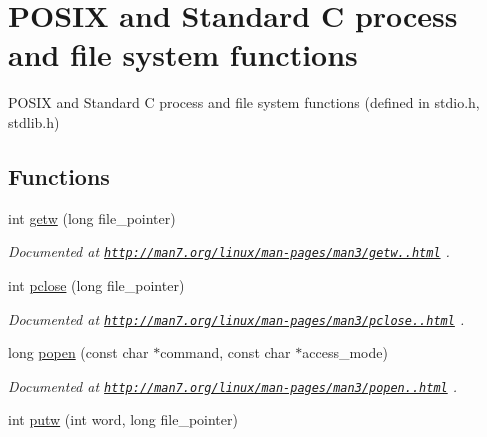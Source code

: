 \hypertarget{group__process}{\section{P\-O\-S\-I\-X and Standard C process and file system functions}
\label{group__process}
}


P\-O\-S\-I\-X and Standard C process and file system functions (defined in stdio.\-h, stdlib.\-h)  


\subsection*{Functions}
\begin{DoxyCompactItemize}
\item 
\hypertarget{group__process_ga43498c4ca6e30d29db45d768a87e6b6e}{int \hyperlink{group__process_ga43498c4ca6e30d29db45d768a87e6b6e}{getw} (long file\-\_\-pointer)}\label{group__process_ga43498c4ca6e30d29db45d768a87e6b6e}

\begin{DoxyCompactList}\small\item\em Documented at \href{http://man7.org/linux/man-pages/man3/getw.3.html}{\tt http\-://man7.\-org/linux/man-\/pages/man3/getw..\-html} . \end{DoxyCompactList}\item 
\hypertarget{group__process_ga4f16a59d682aab6b050b69aab05113f4}{int \hyperlink{group__process_ga4f16a59d682aab6b050b69aab05113f4}{pclose} (long file\-\_\-pointer)}\label{group__process_ga4f16a59d682aab6b050b69aab05113f4}

\begin{DoxyCompactList}\small\item\em Documented at \href{http://man7.org/linux/man-pages/man3/pclose.3.html}{\tt http\-://man7.\-org/linux/man-\/pages/man3/pclose..\-html} . \end{DoxyCompactList}\item 
\hypertarget{group__process_ga977bb639528d6aab8d0ce9afd57ec289}{long \hyperlink{group__process_ga977bb639528d6aab8d0ce9afd57ec289}{popen} (const char $\ast$command, const char $\ast$access\-\_\-mode)}\label{group__process_ga977bb639528d6aab8d0ce9afd57ec289}

\begin{DoxyCompactList}\small\item\em Documented at \href{http://man7.org/linux/man-pages/man3/popen.3.html}{\tt http\-://man7.\-org/linux/man-\/pages/man3/popen..\-html} . \end{DoxyCompactList}\item 
\hypertarget{group__process_ga2700ec93bb976995aac3741ed33589b4}{int \hyperlink{group__process_ga2700ec93bb976995aac3741ed33589b4}{putw} (int word, long file\-\_\-pointer)}\label{group__process_ga2700ec93bb976995aac3741ed33589b4}


\end{DoxyCompactItemize}
